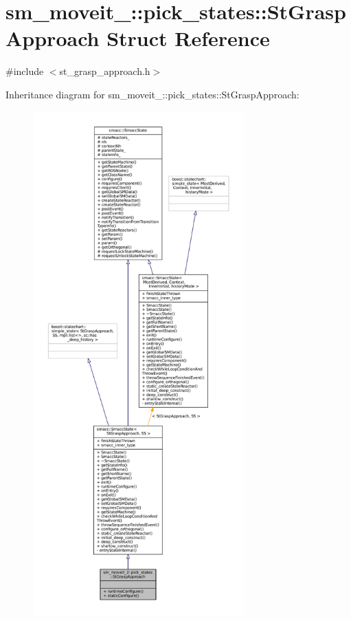 \hypertarget{structsm__moveit__2_1_1pick__states_1_1StGraspApproach}{}\section{sm\+\_\+moveit\+\_\+:\+:pick\+\_\+states\+:\+:St\+Grasp\+Approach Struct Reference}
\label{structsm__moveit__2_1_1pick__states_1_1StGraspApproach}


{\ttfamily \#include $<$st\+\_\+grasp\+\_\+approach.\+h$>$}



Inheritance diagram for sm\+\_\+moveit\+\_\+:\+:pick\+\_\+states\+:\+:St\+Grasp\+Approach\+:
\nopagebreak
\begin{figure}[H]
\begin{center}
\leavevmode
\includegraphics[height=550pt]{structsm__moveit__2_1_1pick__states_1_1StGraspApproach__inherit__graph}
\end{center}
\end{figure}


